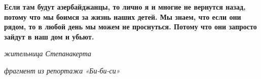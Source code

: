 \begin{leftbar}
	\bfseries
Если там будут азербайджанцы, то лично я и многие не вернутся назад, потому что
мы боимся за жизнь наших детей. Мы знаем, что если они рядом, то в любой день
мы можем не проснуться. Потому что они запросто зайдут в наш дом и убьют.\par
\emph{жительница Степанакерта}\par
{\em фрагмент из репортажа «Би-би-си» \/}
\end{leftbar}

